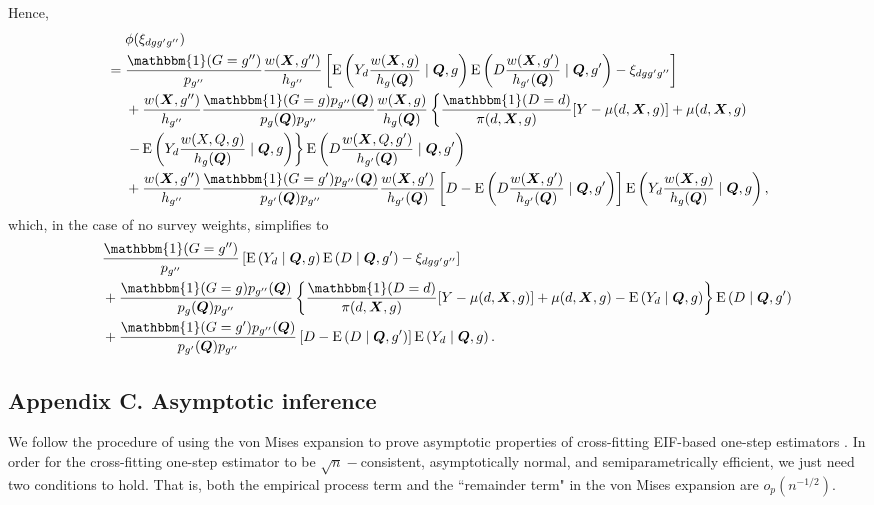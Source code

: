 \documentclass[12pt,a4paper]{article}
\newcommand{\E}{\operatorname{E}}
\def\X{{\boldsymbol X}}
\def\Q{{\boldsymbol Q}}
\def\one{\mathbbm{1}}
\begin{document}
Hence,
\begin{align*}
    &\phantom{{}={}} \phi(\xi_{dgg'g''}) \\
    &= \frac{\one(G=g'')}{p_{g''}}\frac{w(\X,g'')}{h_{g''}} \left[ \E \left(Y_d \frac{w(\X,g)}{h_{g}(\Q)}  \mid \Q, g \right) \E \left(D \frac{w(\X,g')}{h_{g'}(\Q)} \mid \Q, g' \right) - \xi_{dgg'g''} \right] \\
    &\phantom{{}={}} + \frac{w(\X,g'')}{h_{g''}}  \frac{\one(G=g) p_{g''}(\Q)}{p_g(\Q)p_{g''}} \frac{w(\X,g)}{h_g(\Q)} \left\{ \frac{\one(D=d)}{\pi(d,\X,g)} [Y-\mu(d,\X,g)]+\mu(d,\X,g) \right. \\
    &\phantom{{}={}} \left. - \E \left(Y_d \frac{w(X,Q,g)}{h_g(\Q)} \mid \Q,g \right) \right\} \E \left(D \frac{w(\X,Q,g')}{h_{g'}(\Q)} \mid \Q,g' \right) \\
    &\phantom{{}={}} + \frac{w(\X,g'')}{h_{g''}}  \frac{\one(G=g')p_{g''}(\Q)}{p_{g'}(\Q)p_{g''}} \frac{w(\X,g')}{h_{g'}(\Q)} \left[ D-\E \left(D \frac{w(\X,g')}{h_{g'}(\Q)} \mid \Q, g' \right) \right] \E\left( Y_d \frac{w(\X,g)}{h_g(\Q)} \mid \Q, g \right), 
\end{align*}
which, in the case of no survey weights, simplifies to 
\begin{align*}
    &\phantom{{}={}} \frac{\one(G=g'')}{p_{g''}} \left[ \E \left(Y_d \mid \Q, g \right) \E \left(D \mid \Q, g' \right) - \xi_{dgg'g''} \right] \\
    &\phantom{{}={}} + \frac{\one(G=g) p_{g''}(\Q)}{p_g(\Q)p_{g''}} \left\{ \frac{\one(D=d)}{\pi(d,\X,g)} [Y-\mu(d,\X,g)]+\mu(d,\X,g) - \E \left(Y_d \mid \Q,g \right) \right\} \E \left(D \mid \Q,g' \right) \\
    &\phantom{{}={}} + \frac{\one(G=g')p_{g''}(\Q)}{p_{g'}(\Q)p_{g''}} \left[ D-\E \left(D \mid \Q, g' \right) \right] \E\left( Y_d \mid \Q, g \right).
\end{align*}

\subsection*{Appendix C. Asymptotic inference}

We follow the procedure of using the von Mises expansion to prove asymptotic properties of cross-fitting EIF-based one-step estimators \citep{hines_demystifying_2022, kennedy_semiparametric_2022, fisher_visually_2021}. In order for the cross-fitting one-step estimator to be  $\sqrt{n}-$consistent, asymptotically normal, and semiparametrically efficient, we just need two conditions to hold. That is, both the empirical process term and the ``remainder term" in the von Mises expansion are $o_p(n^{-1/2})$.
\end{document}

